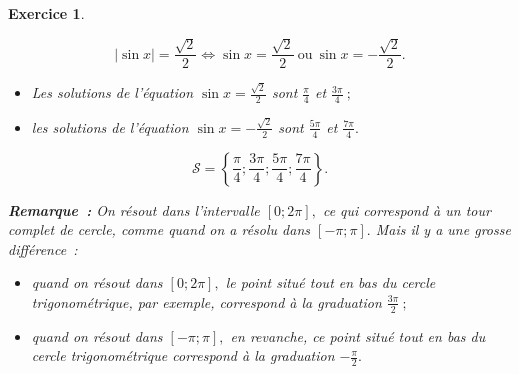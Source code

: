 \documentclass[10pt]{article}
\newtheorem{exo}{Exercice}
\begin{document}
\begin{exo}
\begin{enumerate}
\begin{multicols}{2}
\medskip

\[
\left|\sin x\right|=\frac{\sqrt{2}}{2}\iff \sin x =\frac{\sqrt{2}}{2}~\text{ou}~\sin x =-\frac{\sqrt{2}}{2}.\]

\begin{itemize}
\item[\textbullet] Les solutions de l'équation $\sin x=\frac{\sqrt{2}}{2}$ sont $\frac{\pi}{4}$ et  $\frac{3\pi}{4}~;$
\item[\textbullet] les solutions de l'équation $\sin x=-\frac{\sqrt{2}}{2}$ sont $\frac{5\pi}{4}$ et  $\frac{7\pi}{4}.$
\end{itemize}


\medskip

 \[\boxed{\mathcal{S}=\left\{\frac{\pi}{4};\frac{3\pi}{4};\frac{5\pi}{4};\frac{7\pi}{4}\right\}.}\]

\medskip

\textbf{Remarque~:} On résout dans l'intervalle  $\left[0;2\pi\right],$ ce qui correspond à un tour complet de cercle, comme quand on a résolu dans  $\left[-\pi;\pi\right].$ Mais il y a une grosse différence~:

\begin{itemize}
\item[\textbullet] quand on résout dans $\left[0;2\pi\right],$ le point situé tout en bas du cercle trigonométrique, par exemple, correspond à la graduation $\frac{3\pi}{2}~;$
\item[\textbullet] quand on résout dans $\left[-\pi;\pi\right],$ en revanche, ce point situé tout en bas du cercle trigonométrique correspond à la graduation $-\frac{\pi}{2}.$
\end{itemize}



\end{multicols}
\end{enumerate}
\end{exo}
\end{document}
